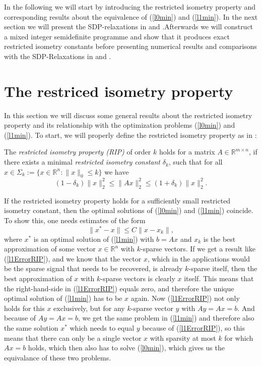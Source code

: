 \documentclass[a4paper,11pt,1p]{elsarticle}
\newcommand{\R}{\mathds{R}}
\begin{document}
In the following we will start by introducing the restricted isometry property and corresponding results about the equivalence of (\ref{l0min}) and (\ref{l1min}). In the next section we will present the SDP-relaxations in \cite{Asp07} 
and \cite{Asp08}.Afterwards we will construct a mixed integer semidefinite programme and show that it produces exact restricted isometry constants before presenting numerical results and comparisons with the SDP-Relaxations in 
\cite{Asp07} and \cite{Asp08}.

\section{The restriced isometry property}

In this section we will discuss some general results about the restricted isometry property and its relationship with the optimization problems (\ref{l0min}) and (\ref{l1min}). To start, we will properly define the restricted
isometry property as in \cite{CT05}:

\begin{rmk} \label{ripdef}
The \emph{restricted isometry property (RIP)} of order $k$ holds for a matrix $A \in \R^{m \times n}$, if there exists a minimal \emph{restricted isometry constant} $\delta_k$, such that for all $x \in \Sigma_k := 
\{x \in \R^n : \|x\|_0 \leq k \}$ we have
 \begin{equation}\label{rip}
  (1-\delta_k)\|x\|_2^2 \leq \|Ax\|_2^2 \leq (1+\delta_k)\|x\|_2^2.
 \end{equation}
 \end{rmk}
 
 If the restricted isometry property holds for a sufficiently small restricted isometry constant, then the optimal solutions of (\ref{l0min}) and (\ref{l1min}) coincide. To show this, one needs estimates of the form
  \begin{equation}\label{l1ErrorRIP}
  \|x^* - x \| \leq C \|x - x_k \|,
 \end{equation}
 where $x^*$ is an optimal solution of (\ref{l1min}) with $b = Ax$ and $x_k$ is the best approximation of some vector $x \in \R^n$ with $k$-sparse vectors. If we get a result like (\ref{l1ErrorRIP}), and we know that the vector $x$, which in the 
 applications would be the sparse signal that needs to be recovered, is already $k$-sparse itself, then the best approximation of $x$ with $k$-sparse vectors is clearly $x$ itself. This means that the right-hand-side in 
 (\ref{l1ErrorRIP}) equals zero, and therefore the unique optimal solution of (\ref{l1min}) has to be $x$ again. Now (\ref{l1ErrorRIP}) not only holds for this $x$ exclusively, but for any $k$-sparse vector $y$ with $Ay=Ax=b$. And 
 because of $Ay=Ax=b$, we get the same problem in (\ref{l1min}) and therefore also the same solution $x^*$ which needs to equal $y$ because of (\ref{l1ErrorRIP}), so this means that there can only be a single vector $x$ with sparsity
 at most $k$ for which $Ax=b$ holds, which then also has to solve (\ref{l0min}), which gives us the equivalance of these two problems.
 
\end{document}
